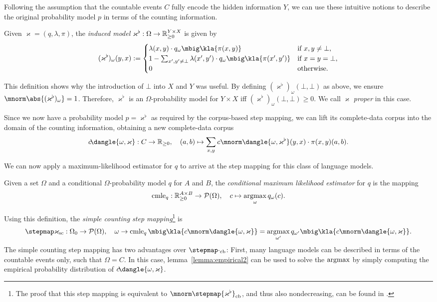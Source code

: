 Following the assumption that the countable events $C$ fully encode the hidden
information $Y$, we can use these intuitive notions to describe the original
probability model $p$ in terms of the counting information.

\begin{definition}
 Given $\varkappa=(q,\lambda,\pi)$, the \emph{induced model}
 $\varkappa^\flat:\Omega\to\mathbb R_{\geq0}^{Y\times X}$ is given by
 \[
  (\varkappa^\flat)_\omega(y,x) := \begin{cases}
   \lambda(x,y) \cdot q_\omega\mbig\kla{\pi(x,y)} & \text{if } x,y\neq\bot, \\
   1 - \sum_{x',y'\neq\bot} \lambda(x',y') \cdot q_\omega\mbig\kla{\pi(x',y')} & \text{if } x = y = \bot, \\
   0 & \text{otherwise}.
  \end{cases}
 \]
\end{definition}

This definition shows why the introduction of $\bot$ into $X$ and $Y$ was
useful. By defining $(\varkappa^\flat)_\omega(\bot,\bot)$ as above, we ensure
$\mnorm\abs{(\varkappa^\flat)_\omega} = 1$. Therefore, $\varkappa^\flat$ is an
$\Omega$-probability model for $Y\times X$ iff
$(\varkappa^\flat)_\omega(\bot,\bot) \geq 0$. We call $\varkappa$ \emph{proper}
in this case.

Since we now have a probability model $p = \varkappa^\flat$ as required by the
corpus-based step mapping, we can lift its complete-data corpus into the domain
of the counting information, obtaining a new complete-data corpus
\[
 c\!\dangle{\omega,\varkappa}: C \to \zr_{\geq0}, \quad
 (a,b) \mapsto \sum_{x,y} c\mnorm\dangle{\omega,\varkappa^\flat}(y,x) \cdot \pi(x,y)(a,b).
\]

We can now apply a maximum-likelihood estimator for $q$ to arrive at the step
mapping for this class of language models.

\begin{definition}
 Given a set $\Omega$ and a conditional $\Omega$-probability model $q$ for $A$
 and $B$, the \emph{conditional maximum likelihood estimator} for $q$ is the mapping
 \[
  \cmle_q: \zr_{\geq0}^{A\times B} \to \up(\Omega),
  \quad
  c \mapsto \argmax_\omega q_\omega(c).
 \]
\end{definition}

Using this definition, the \emph{simple counting step mapping}\footnote{The
proof that this step mapping is equivalent to
$\mnorm\stepmap{\varkappa^\flat}_\mathrm{cb}$, and thus also nondecreasing, can
be found in \cite[p.~13]{bucstuvog15}.} is
\[
 \stepmap\varkappa_\mathrm{sc}: \Omega_0 \to \up(\Omega), \quad
 \omega \to \cmle_q\mbig\kla{c\mnorm\dangle{\omega,\varkappa}} = \argmax_{\omega'} q_{\omega'}\mbig\kla{c\mnorm\dangle{\omega,\varkappa}}.
\]
The simple counting step mapping has two advantages over
$\stepmap\cdot_\mathrm{cb}$: First, many language models can be described in
terms of the countable events only, such that $\Omega = C$. In this case,
lemma~\ref{lemma:empirical2} can be used to solve the $\argmax$ by simply
computing the empirical probability distribution of
$c\!\dangle{\omega,\varkappa}$.

